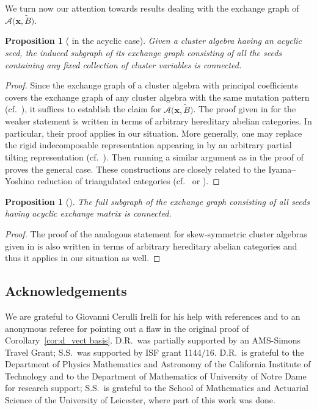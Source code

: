 \documentclass[pdftex]{sigma}
\newcommand{\bfx}{\mathbf{x}}
\newcommand{\cA}{\mathcal{A}}
\numberwithin{equation}{section}
\newtheorem{Proposition}[Theorem]{Proposition}
 { \theoremstyle{definition}
\newtheorem{Remark}[Theorem]{Remark} }
\begin{document}
We turn now our attention towards results dealing with the exchange graph of $\cA\big(\bfx,\widetilde{B}\big)$.

\begin{Proposition}[{\cite[Conjecture 3.10]{reading-speyer}} in the acyclic case] Given a cluster algebra having an acyclic seed, the induced subgraph of its exchange graph consisting of all the seeds containing any fixed collection of cluster variables is connected.
\end{Proposition}
\begin{proof} Since the exchange graph of a cluster algebra with principal coefficients covers the exchange graph of any cluster algebra with the same mutation pattern (cf.~\cite{fomin-zelevinsky4}), it suffices to establish the claim for $\cA\big(\bfx,\widetilde{B}\big)$. The proof given in \cite[Corollary~3]{caldero-keller2} for the weaker statement \cite[Conjecture~4.14(3)]{FZ03} is written in terms of arbitrary hereditary abelian categories. In particular, their proof applies in our situation. More generally, one may replace the rigid indecomposable representation appearing in \cite[Section~5.4]{caldero-keller2} by an arbitrary partial tilting representation (cf.~\cite[Proposition~3]{happel-rickard-schofield}). Then running a similar argument as in the proof of \cite[Theorem~6]{caldero-keller2} proves the general case. These constructions are closely related to the Iyama--Yoshino reduction of triangulated categories (cf.~\cite[Section~4]{iyama-yoshino} or \cite[Section~7.2]{keller}).
 \end{proof}

 \begin{Proposition}[{\cite[Conjecture 4.14(4)]{FZ03}}] The full subgraph of the exchange graph consisting of all seeds having acyclic exchange matrix is connected.
 \end{Proposition}
 \begin{proof} The proof of the analogous statement for skew-symmetric cluster algebras given in \cite[Corollary~4]{caldero-keller2} is also written in terms of arbitrary hereditary abelian categories and thus it applies in our situation as well.
 \end{proof}

\subsection*{Acknowledgements}
 We are grateful to Giovanni Cerulli Irelli for his help with references and to an anonymous referee for pointing out a flaw in the original proof of Corollary~\ref{cor:d_vect basis}. D.R.~was partially supported by an AMS-Simons Travel Grant; S.S.~was supported by ISF grant 1144/16.
D.R.~is grateful to the Department of Physics Mathematics and Astronomy of the California Institute of Technology and to the Department of Mathematics of University of Notre Dame for research support; S.S.~is grateful to the School of Mathematics and Actuarial Science of the University of Leicester, where part of this work was done.
\end{document}
